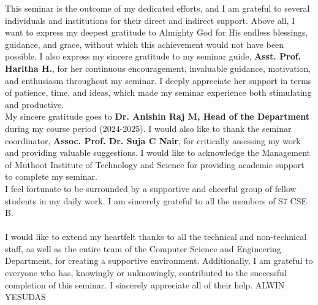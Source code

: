 %
%
This seminar is the outcome of my dedicated efforts, and I am grateful to several individuals and institutions for their direct and indirect support. Above all, I want to express my deepest gratitude to Almighty God for His endless blessings, guidance, and grace, without which this achievement would not have been possible.
%
I also express my sincere gratitude to my seminar guide, \textbf{Asst. Prof. Haritha H.}, for her continuous encouragement, invaluable guidance, motivation, and enthusiasm throughout my seminar. I deeply appreciate her support in terms of patience, time, and ideas, which made my seminar experience both stimulating and productive. \\[0.5cm]
%
My sincere gratitude goes to\textbf{ Dr. Anishin Raj M, Head of the Department} during my course period (2024-2025). I would also like to thank the seminar coordinator, \textbf{Assoc. Prof. Dr. Suja C Nair}, for critically assessing my work and providing valuable suggestions. I would like to acknowledge the Management of Muthoot Institute of Technology and Science for providing academic support to complete my seminar.\\[0.5cm]
%
I feel fortunate to be surrounded by a supportive and cheerful group of fellow students in my daily work. I am sincerely grateful to all the members of S7 CSE B.\\\\
%
I would like to extend my heartfelt thanks to all the technical and non-technical staff, as well as the entire team of the Computer Science and Engineering Department, for creating a supportive environment. Additionally, I am grateful to everyone who has, knowingly or unknowingly, contributed to the successful completion of this seminar. I sincerely appreciate all of their help.
%
%
%
\vfill %
\hfill %
ALWIN YESUDAS
%
%
%